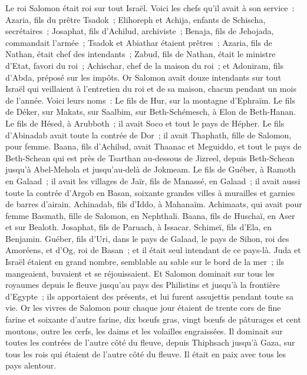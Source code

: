 \begin{multicols}{2}
\VerseOne{}Le roi Salomon était roi sur tout Israël.
Voici les chefs qu'il avait à son service~: Azaria, fils du prêtre Tsadok~;
Elihoreph et Achija, enfants de Schischa, secrétaires~; Josaphat, fils d'Achilud, archiviste~;
Benaja, fils de Jehojada, commandait l'armée~; Tsadok et Abiathar étaient prêtres~;
Azaria, fils de Nathan, était chef des intendants~; Zabud, fils de Nathan, était le ministre d'Etat, favori du roi~;
Achischar, chef de la maison du roi~; et Adoniram, fils d'Abda, préposé sur les impôts.
Or Salomon avait douze intendants sur tout Israël qui veillaient à l'entretien du roi et de sa maison, chacun pendant un mois de l'année.
Voici leurs noms~: Le fils de Hur, sur la montagne d'Ephraïm.
Le fils de Déker, sur Makats, sur Saalbim, sur Beth-Schémesch, à Elon de Beth-Hanan.
Le fils de Hésed, à Arubboth~; il avait Soco et tout le pays de Hépher.
Le fils d'Abinadab avait toute la contrée de Dor~; il avait Thaphath, fille de Salomon, pour femme.
Baana, fils d'Achilud, avait Thaanac et Meguiddo, et tout le pays de Beth-Schean qui est près de Tsarthan au-dessous de Jizreel, depuis Beth-Schean jusqu'à Abel-Mehola et jusqu'au-delà de Jokmeam.
Le fils de Guéber, à Ramoth en Galaad~; il avait les villages de Jaïr, fils de Manassé, en Galaad~; il avait aussi toute la contrée d'Argob en Basan, soixante grandes villes à murailles et garnies de barres d'airain.
Achinadab, fils d'Iddo, à Mahanaïm.
Achimaats, qui avait pour femme Basmath, fille de Salomon, en Nephthali.
Baana, fils de Huschaï, en Aser et sur Bealoth.
Josaphat, fils de Paruach, à Issacar.
Schimeï, fils d'Ela, en Benjamin.
Guéber, fils d'Uri, dans le pays de Galaad, le pays de Sihon, roi des Amoréens, et d'Og, roi de Basan~; et il était seul intendant de ce pays-là.
Juda et Israël étaient en grand nombre, semblable au sable sur le bord de la mer~; ils mangeaient, buvaient et se réjouissaient.
Et Salomon dominait sur tous les royaumes depuis le fleuve jusqu'au pays des Philistins et jusqu'à la frontière d'Egypte~; ils apportaient des présents, et lui furent assujettis pendant toute sa vie.
Or les vivres de Salomon pour chaque jour étaient de trente cors de fine farine et soixante d'autre farine,
dix bœufs gras, vingt bœufs de pâturages et cent moutons, outre les cerfs, les daims et les volailles engraissées.
Il dominait sur toutes les contrées de l'autre côté du fleuve, depuis Thiphsach jusqu'à Gaza, sur tous les rois qui étaient de l'autre côté du fleuve. Il était en paix avec tous les pays alentour.

\end{multicols}

